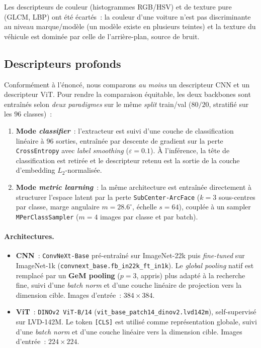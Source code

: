 \documentclass[a4paper,11pt]{article}
\begin{document}
Les descripteurs de couleur (histogrammes RGB/HSV) et de texture pure
(GLCM, LBP) ont été écartés~: la couleur d'une voiture n'est pas
discriminante au niveau marque/modèle (un modèle existe en plusieurs
teintes) et la texture du véhicule est dominée par celle de
l'arrière-plan, source de bruit.

\subsection{Descripteurs profonds}
\label{subsec:dl}

Conformément à l'énoncé, nous comparons \emph{au moins} un descripteur
CNN et un descripteur ViT. Pour rendre la comparaison équitable, les deux
backbones sont entraînés selon \emph{deux paradigmes} sur le même
\textit{split} train/val ($80/20$, stratifié sur les $96$ classes)~:

\begin{enumerate}
    \item \textbf{Mode \textit{classifier}}~: l'extracteur est suivi d'une
    couche de classification linéaire à $96$ sorties, entraînée par
    descente de gradient sur la perte \texttt{CrossEntropy} avec
    \textit{label smoothing} ($\varepsilon = 0.1$). À l'inférence, la
    tête de classification est retirée et le descripteur retenu est la
    sortie de la couche d'embedding $L_2$-normalisée.

    \item \textbf{Mode \textit{metric learning}}~: la même architecture
    est entraînée directement à structurer l'espace latent par la perte
    \texttt{SubCenter-ArcFace} ($k=3$ sous-centres par classe, marge
    angulaire $m=28.6^{\circ}$, échelle $s=64$), couplée à un sampler
    \texttt{MPerClassSampler} ($m=4$ images par classe et par batch).
\end{enumerate}

\paragraph{Architectures.}
\begin{itemize}
    \item \textbf{CNN}~: \texttt{ConvNeXt-Base} pré-entraîné sur
    ImageNet-22k puis \textit{fine-tuned} sur ImageNet-1k
    (\texttt{convnext\_base.fb\_in22k\_ft\_in1k}). Le \textit{global
    pooling} natif est remplacé par un \textbf{GeM pooling}
    ($p=3$, appris) plus adapté à la recherche fine, suivi d'une
    \textit{batch norm} et d'une couche linéaire de projection vers la
    dimension cible. Images d'entrée~: $384\times 384$.

    \item \textbf{ViT}~: \texttt{DINOv2 ViT-B/14}
    (\texttt{vit\_base\_patch14\_dinov2.lvd142m}), self-supervisé sur
    LVD-142M. Le token \texttt{[CLS]} est utilisé comme représentation
    globale, suivi d'une \textit{batch norm} et d'une couche linéaire
    vers la dimension cible. Images d'entrée~: $224\times 224$.
\end{itemize}
\end{document}
